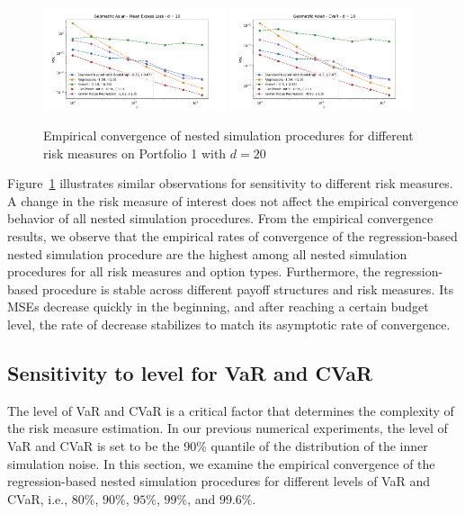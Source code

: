 \begin{figure}[ht!] 
    \centering
    \includegraphics[width=0.48\textwidth]{./project1/figures/figure8a.png}
    \includegraphics[width=0.48\textwidth]{./project1/figures/figure8b.png}
    \caption{Empirical convergence of nested simulation procedures for different risk measures on Portfolio 1 with $d=20$}
    \label{fig1:110x}
\end{figure}

Figure~\ref{fig1:110x} illustrates similar observations for sensitivity to different risk measures.
A change in the risk measure of interest does not affect the empirical convergence behavior of all nested simulation procedures.
From the empirical convergence results, we observe that the empirical rates of convergence of the regression-based nested simulation procedure are the highest among all nested simulation procedures for all risk measures and option types.
Furthermore, the regression-based procedure is stable across different payoff structures and risk measures. 
Its MSEs decrease quickly in the beginning, and after reaching a certain budget level, the rate of decrease stabilizes to match its asymptotic rate of convergence.

\subsection{Sensitivity to level for VaR and CVaR} \label{sec1:sensitivity-level}

The level of VaR and CVaR is a critical factor that determines the complexity of the risk measure estimation.
In our previous numerical experiments, the level of VaR and CVaR is set to be the 90\% quantile of the distribution of the inner simulation noise.
In this section, we examine the empirical convergence of the regression-based nested simulation procedures for different levels of VaR and CVaR, i.e., $80\%$, $90\%$, $95\%$, $99\%$, and $99.6\%$.

